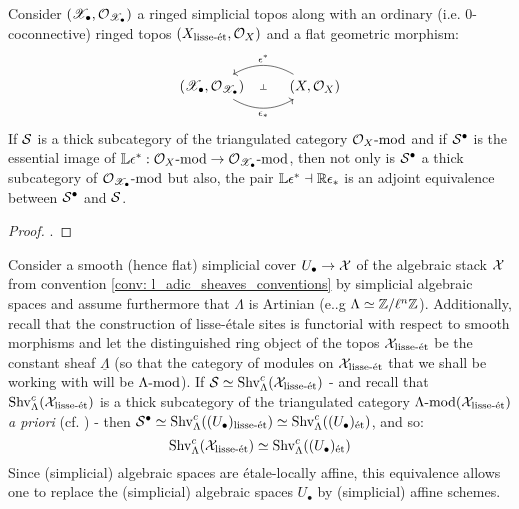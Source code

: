     \begin{proposition}
        Consider $(\scrX_{\bullet}, \calO_{\scrX_{\bullet}})$ a ringed simplicial topos along with an ordinary (i.e. $0$-coconnective) ringed topos $(X_{\lisse\-\et}, \calO_X)$ and a flat geometric morphism:
            $$
                \begin{tikzcd}
                	{(\scrX_{\bullet}, \calO_{\scrX_{\bullet}})} & {(X, \calO_X)}
                	\arrow[""{name=0, anchor=center, inner sep=0}, "{\e_*}"', bend right, from=1-1, to=1-2]
                	\arrow[""{name=1, anchor=center, inner sep=0}, "{\e^*}"', bend right, from=1-2, to=1-1]
                	\arrow["\dashv"{anchor=center, rotate=-90}, draw=none, from=1, to=0]
                \end{tikzcd}
            $$
        If $\S$ is a thick subcategory of the triangulated category $\calO_X\mod$ and if $\S^{\bullet}$ is the essential image of $\L\e^*: \calO_X\mod \to \calO_{\scrX_{\bullet}}\mod$, then not only is $\S^{\bullet}$ a thick subcategory of $\calO_{\scrX_{\bullet}}\mod$ but also, the pair $\L\e^* \ladjoint \R\e_*$ is an adjoint equivalence between $\S^{\bullet}$ and $\S$.
    \end{proposition}
        \begin{proof}
            \cite[Lemma 2.2.2 and Theorem 2.2.3]{laszlo_olsson_adic_sheaves_on_artin_stacks_1}.
        \end{proof}
    \begin{example} \label{example: gluing_constructible_sheaves}
        Consider a smooth (hence flat) simplicial cover $U_{\bullet} \to \calX$ of the algebraic stack $\calX$ from convention \ref{conv: l_adic_sheaves_conventions} by simplicial algebraic spaces and assume furthermore that $\Lambda$ is Artinian (e..g $\Lambda \cong \Z/\ell^n\Z$). Additionally, recall that the construction of lisse-\'etale sites is functorial with respect to smooth morphisms and let the distinguished ring object of the topos $\calX_{\lisse\-\et}$ be the constant sheaf $\underline{\Lambda}$ (so that the category of modules on $\calX_{\lisse\-\et}$ that we shall be working with will be $\Lambda\mod$). If $\S \cong \Shv_{\Lambda}^c(\calX_{\lisse\-\et})$ - and recall that $\Shv_{\Lambda}^c(\calX_{\lisse\-\et})$ is a thick subcategory of the triangulated category $\Lambda\mod(\calX_{\lisse\-\et})$ \textit{a priori} (cf. \cite[\href{https://stacks.math.columbia.edu/tag/03RZ}{Tag 03RZ}]{stacks}) - then $\S^{\bullet} \cong \Shv_{\Lambda}^c((U_{\bullet})_{\lisse\-\et}) \cong \Shv_{\Lambda}^c((U_{\bullet})_{\et})$, and so:
            $$\Shv_{\Lambda}^c(\calX_{\lisse\-\et}) \cong \Shv_{\Lambda}^c((U_{\bullet})_{\et})$$
        Since (simplicial) algebraic spaces are \'etale-locally affine, this equivalence allows one to replace the (simplicial) algebraic spaces $U_{\bullet}$ by (simplicial) affine schemes. 
    \end{example}
    
